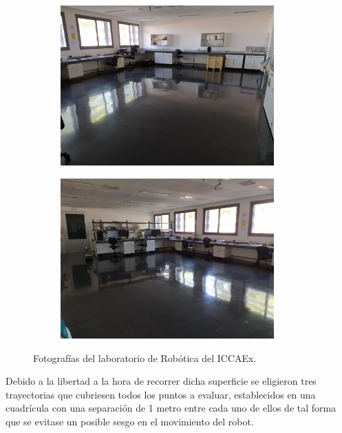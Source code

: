 \begin{figure}[H]
  \begin{subfigure}[b]{.5\textwidth}
    \centering
    \includegraphics[width=0.9\textwidth]{pic/lab1.jpg}
    \label{fig:foto_lab1}
  \end{subfigure}
  \begin{subfigure}[b]{.5\textwidth}
    \centering
    \includegraphics[width=0.9\textwidth]{pic/lab2.jpg}
    \label{fig:foto_lab2}
  \end{subfigure}
  \caption{Fotografías del laboratorio de Robótica del ICCAEx.}
  \label{fig:foto_lab}
\end{figure}

Debido a la libertad a la hora de recorrer dicha superficie se eligieron tres trayectorias que cubriesen todos los puntos a evaluar, establecidos en una cuadrícula con una separación de 1 metro entre cada uno de ellos de tal forma que se evitase un posible sesgo en el movimiento del robot.

